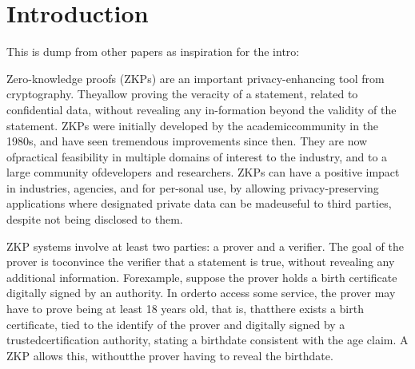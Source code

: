 \chapter{Introduction}

This is dump from other papers as inspiration for the intro:


Zero-knowledge proofs (ZKPs) are an important privacy-enhancing tool from cryptography. Theyallow proving the veracity of a statement, related to confidential data, without revealing any in-formation beyond the validity of the statement. ZKPs were initially developed by the academiccommunity in the 1980s, and have seen tremendous improvements since then. They are now ofpractical feasibility in multiple domains of interest to the industry, and to a large community ofdevelopers and researchers. ZKPs can have a positive impact in industries, agencies, and for per-sonal use, by allowing privacy-preserving applications where designated private data can be madeuseful to third parties, despite not being disclosed to them. 

ZKP systems involve at least two parties: a prover and a verifier. The goal of the prover is toconvince the verifier that a statement is true, without revealing any additional information. Forexample, suppose the prover holds a birth certificate digitally signed by an authority. In orderto access some service, the prover may have to prove being at least 18 years old, that is, thatthere exists a birth certificate, tied to the identify of the prover and digitally signed by a trustedcertification authority, stating a birthdate consistent with the age claim. A ZKP allows this, withoutthe prover having to reveal the birthdate.

